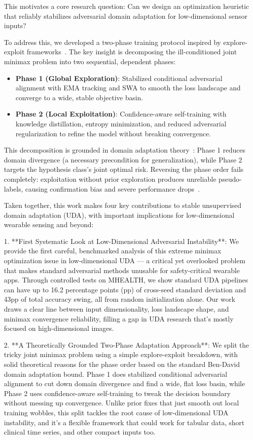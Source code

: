 \documentclass[conference]{IEEEtran}
\begin{document}
This motivates a core research question: Can we design an optimization heuristic that reliably stabilizes adversarial domain adaptation for low-dimensional sensor inputs?

To address this, we developed a two-phase training protocol inspired by explore-exploit frameworks~\cite{vcrepinvsek2013exploration}. The key insight is decomposing the ill-conditioned joint minimax problem into two sequential, dependent phases:
\begin{itemize}
    \item \textbf{Phase 1 (Global Exploration)}: Stabilized conditional adversarial alignment with EMA tracking and SWA to smooth the loss landscape and converge to a wide, stable objective basin.
    \item \textbf{Phase 2 (Local Exploitation)}: Confidence-aware self-training with knowledge distillation, entropy minimization, and reduced adversarial regularization to refine the model without breaking convergence.
\end{itemize}
This decomposition is grounded in domain adaptation theory~\cite{ben2010theory}: Phase 1 reduces domain divergence (a necessary precondition for generalization), while Phase 2 targets the hypothesis class’s joint optimal risk. Reversing the phase order fails completely: exploitation without prior exploration produces unreliable pseudo-labels, causing confirmation bias and severe performance drops~\cite{arazo2020pseudo}.

Taken together, this work makes four key contributions to stable unsupervised domain adaptation (UDA), with important implications for low-dimensional wearable sensing and beyond:

1.  **First Systematic Look at Low-Dimensional Adversarial Instability**: We provide the first careful, benchmarked analysis of this extreme minimax optimization issue in low-dimensional UDA — a critical yet overlooked problem that makes standard adversarial methods unusable for safety-critical wearable apps. Through controlled tests on MHEALTH, we show standard UDA pipelines can have up to 16.2 percentage points (pp) of cross-seed standard deviation and 43pp of total accuracy swing, all from random initialization alone. Our work draws a clear line between input dimensionality, loss landscape shape, and minimax convergence reliability, filling a gap in UDA research that’s mostly focused on high-dimensional images.

2.  **A Theoretically Grounded Two-Phase Adaptation Approach**: We split the tricky joint minimax problem using a simple explore-exploit breakdown, with solid theoretical reasons for the phase order based on the standard Ben-David domain adaptation bound. Phase 1 does stabilized conditional adversarial alignment to cut down domain divergence and find a wide, flat loss basin, while Phase 2 uses confidence-aware self-training to tweak the decision boundary without messing up convergence. Unlike prior fixes that just smooth out local training wobbles, this split tackles the root cause of low-dimensional UDA instability, and it’s a flexible framework that could work for tabular data, short clinical time series, and other compact inputs too.
\end{document}
